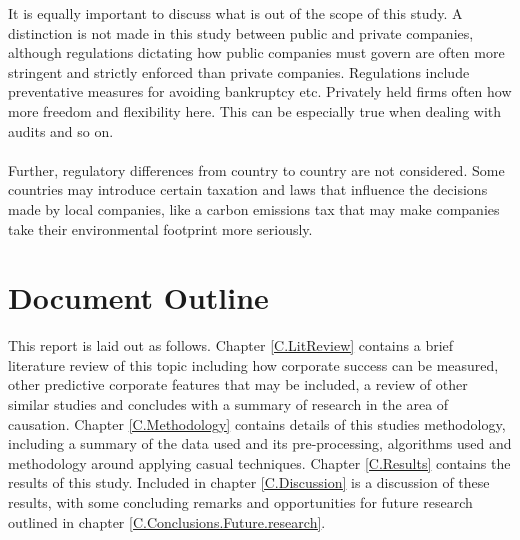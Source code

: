 {\begin{enumerate}
\end{enumerate}
{It is equally important to discuss what is out of the scope of this study. A distinction is not made in this study between public and private companies, although regulations dictating how public companies must govern are often more stringent and strictly enforced than private companies. Regulations include preventative measures for avoiding bankruptcy etc. Privately held firms often how more freedom and flexibility here. This can be especially true when dealing with audits and so on. \\\\
Further, regulatory differences from country to country are not considered. Some countries may introduce certain taxation and laws that influence the decisions made by local companies, like a carbon emissions tax that may make companies take their environmental footprint more seriously.} 
}
\section{Document Outline}
{This report is laid out as follows. Chapter \ref{C.LitReview} contains a brief literature review of this topic including how corporate success can be measured, other predictive corporate features that may be included, a review of other similar studies and concludes with a summary of research in the area of causation. Chapter \ref{C.Methodology} contains details of this studies methodology, including a summary of the data used and its pre-processing, algorithms used and methodology around applying casual techniques. Chapter \ref{C.Results} contains the results of this study. Included in chapter \ref{C.Discussion} is a discussion of these results, with some concluding remarks and opportunities for future research outlined in chapter \ref{C.Conclusions.Future.research}.      }

